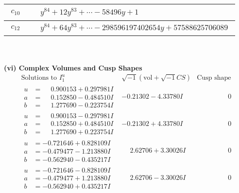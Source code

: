 \documentclass[1p]{elsarticle_modified}
\theoremstyle{definition}
\newcommand{\I}{\sqrt{-1}}
\begin{document}
\begin{tabular}{m{50pt}|m{274pt}}
\hline $$\begin{aligned}c_{10}\end{aligned}$$&$\begin{aligned}
&y^{84}+12 y^{83}+\cdots-58496 y+1
\end{aligned}$\\
\hline $$\begin{aligned}c_{12}\end{aligned}$$&$\begin{aligned}
&y^{84}+64 y^{83}+\cdots-298596197402654 y+57588625706089
\end{aligned}$\\
\hline
\end{tabular}\\~\\
\newpage\flushleft \textbf{(vi) Complex Volumes and Cusp Shapes}
$$\begin{array}{c|c|c}  
\text{Solutions to }I^u_{1}& \I (\text{vol} + \sqrt{-1}CS) & \text{Cusp shape}\\
 \hline 
\begin{aligned}
u &= \phantom{-}0.900153 + 0.297981 I \\
a &= \phantom{-}0.152850 - 0.484510 I \\
b &= \phantom{-}1.277690 - 0.223754 I\end{aligned}
 & -0.21302 - 4.33780 I & \phantom{-0.000000 } 0 \\ \hline\begin{aligned}
u &= \phantom{-}0.900153 - 0.297981 I \\
a &= \phantom{-}0.152850 + 0.484510 I \\
b &= \phantom{-}1.277690 + 0.223754 I\end{aligned}
 & -0.21302 + 4.33780 I & \phantom{-0.000000 } 0 \\ \hline\begin{aligned}
u &= -0.721646 + 0.828109 I \\
a &= -0.479477 - 1.213880 I \\
b &= -0.562940 - 0.435217 I\end{aligned}
 & \phantom{-}2.62706 + 3.30026 I & \phantom{-0.000000 } 0 \\ \hline\begin{aligned}
u &= -0.721646 - 0.828109 I \\
a &= -0.479477 + 1.213880 I \\
b &= -0.562940 + 0.435217 I\end{aligned}
 & \phantom{-}2.62706 - 3.30026 I & \phantom{-0.000000 } 0 \\ \hline\begin{aligned}

\end{aligned}
\end{array}$$
\end{document}
